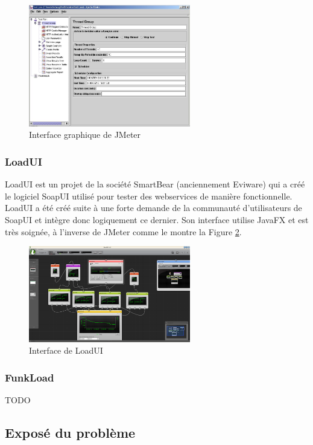 \begin{figure}[h]
\begin{center}
\includegraphics[width=200pt]{img/jmeter.jpg}
\end{center}
\caption{Interface graphique de JMeter}
\label{jmeter_scenario}
\end{figure}

\subsubsection{LoadUI}
LoadUI est un projet de la société SmartBear (anciennement Eviware) qui a créé le logiciel SoapUI utilisé pour tester des webservices de manière fonctionnelle. LoadUI a été créé suite à une forte demande de la communauté d'utilisateurs de SoapUI et intègre donc logiquement ce dernier. Son interface utilise JavaFX et est très soignée, à l'inverse de JMeter comme le montre la Figure \ref{loadui_ui}.

\begin{figure}[h]
\begin{center}
\includegraphics[width=200pt]{img/loadui.jpg}
\end{center}
\caption{Interface de LoadUI}
\label{loadui_ui}
\end{figure}

\subsubsection{FunkLoad}
TODO

\subsection{Exposé du problème}
